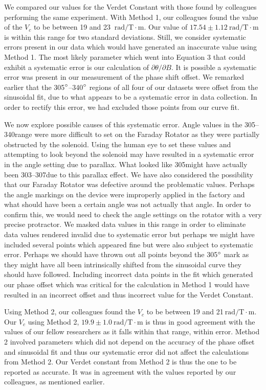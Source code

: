 \documentclass[prb,preprint]{revtex4-1}
\begin{document}
{{We compared our values for the Verdet Constant with those found by colleagues performing the same experiment.  With Method 1, our colleagues found the value of the $V_{c}$ to be between 19 and 23 $\mathrm{~rad/T} \cdot \textrm{m}$.  Our value of $17.54 \pm 1.12 \mathrm{~rad/T} \cdot \textrm{m}$ is within this range for two standard deviations.  Still, we consider systematic errors present in our data which would have generated an inaccurate value using Method 1.  The most likely parameter which went into Equation 3 that could exhibit a systematic error is our calculation of $\partial \theta/\partial B$.  It is possible a systematic error was present in our measurement of the phase shift offset.  We remarked earlier that the 305$\degree$--340$\degree$ regions of all four of our datasets were offset from the sinusoidal fit, due to what appears to be a systematic error in data collection.  In order to rectify this error, we had excluded those points from our curve fit. 

We now explore possible causes of this systematic error.  Angle values in the 305\degree--340\degree range were more difficult to set on the Faraday Rotator as they were partially obstructed by the solenoid.  Using the human eye to set these values and attempting to look beyond the solenoid may have resulted in a systematic error in the angle setting due to parallax.  What looked like 305\degree might have actually been 303\degree--307\degree due to this parallax effect. We have also considered the possibility that our Faraday Rotator was defective around the problematic values.  Perhaps the angle markings on the device were improperly applied in the factory and what should have been a certain angle was not actually that angle.  In order to confirm this, we would need to check the angle settings on the rotator with a very precise protractor.  We masked data values in this range in order to eliminate data values rendered invalid due to systematic error but perhaps we might have included several points which appeared fine but were also subject to systematic error.  Perhaps we should have thrown out all points beyond the 305$\degree$ mark as they might have all been intrinsically shifted from the sinusoidal curve they should have followed.  Including incorrect data points in the fit which generated our phase offset which was critical for the calculation in Method 1 would have resulted in an incorrect offset and thus incorrect value for the Verdet Constant.

Using Method 2, our colleagues found the $V_{c}$ to be between 19 and 21$\mathrm{~rad/T} \cdot \textrm{m}$.  Our $V_{c}$ using Method 2, $19.9 \pm 1.0 \mathrm{~rad/T} \cdot \textrm{m}$ is thus in good agreement with the values of our fellow researchers as it falls within that range, within error. Method 2 involved parameters which did not depend on the accuracy of the phase offset and sinusoidal fit and thus our systematic error did not affect the calculations from Method 2.  Our Verdet constant from Method 2 is thus the one to be reported as accurate.  It was in agreement with the values reported by our colleagues, as mentioned earlier.}

}
\end{document}
